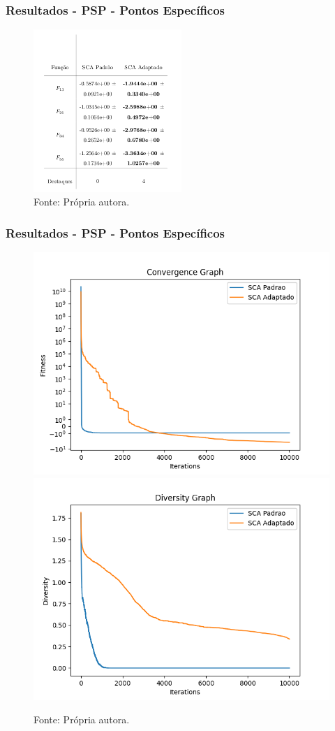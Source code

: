 \documentclass{beamer}
\newcommand{\source}[1]{\vspace{-6pt} \caption*{Fonte: {#1}} }
\begin{document}
\begin{frame}
\frametitle{Resultados - PSP - Pontos Específicos}
\begin{figure}[tbph]
\centering
\includegraphics[width=0.5\textwidth]{resultadosPSPAdapt.png}
\source{Própria autora.}
\label{tab:resPSP2}
\end{figure}
\end{frame}

\begin{frame}
\frametitle{Resultados - PSP - Pontos Específicos}
\begin{figure}[tbph]
\centering
\includegraphics[width=0.49\linewidth]{convF34_F.png}
\includegraphics[width=0.49\linewidth]{divF34_F.png}
\source{Própria autora.}
\label{fig:grafF34_F}
\end{figure}
\end{frame}
\end{document}
